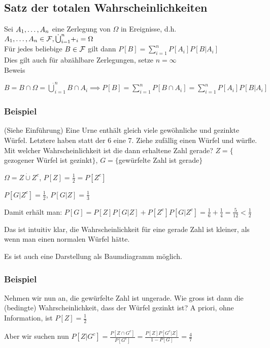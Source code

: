 \subsection{Satz der totalen Wahrscheinlichkeiten}
Sei $A_1, \mathellipsis, A_n$ eine Zerlegung von $\Omega$ in Ereignisse, d.h. $A_1, \mathellipsis, A_n \in \mathcal{F}, \dot\bigcup_{i=1}^n+_i = \Omega$\\
Für jedes beliebige $B \in \mathcal{F}$ gilt dann $P[B] = \sum^n_{i=1}P[A_i]P[B|A_i]$\\
Dies gilt auch für abzählbare Zerlegungen, setze $n = \infty$\\
Beweis
\enumstart
	\item $B = B \cap \Omega = \dot\bigcup_{i=1}^nB\cap A_i \implies P[B] = \sum_{i=1}^nP[B \cap A_i] = \sum_{i=1}^nP[A_i]P[B | A_i]$
\enumend

\subsubsection{Beispiel}
\enumstart
	\item (Siehe Einführung) Eine Urne enthält gleich viele gewöhnliche und gezinkte Würfel. Letztere haben statt der 6 eine 7. Ziehe zufällig einen Würfel und würfle. Mit welcher Wahrscheinlichkeit ist die dann erhaltene Zahl gerade? $Z=\{$gezogener Würfel ist gezinkt$\}$, $G=\{$gewürfelte Zahl ist gerade$\}$
	\item $\Omega = Z \dot\cup Z^c$, $P[Z] = \frac{1}{2} = P[Z^c]$
	\item $P[G | Z^c] = \frac{1}{2}$, $P[G | Z] = \frac{1}{3}$
	\item Damit erhält man: $P[G] = P[Z]P[G | Z] + P[Z^c]P[G | Z^c] = \frac{1}{6} + \frac{1}{4} = \frac{5}{12} < \frac{1}{2}$
	\item Das ist intuitiv klar, die Wahrscheinlichkeit für eine gerade Zahl ist kleiner, als wenn man einen normalen Würfel hätte.
	\item Es ist auch eine Darstellung als Baumdiagramm möglich.
\enumend

\subsubsection{Beispiel}
\enumstart
	\item  Nehmen wir nun an, die gewürfelte Zahl ist ungerade. Wie gross ist dann die (bedingte) Wahrscheinlichkeit, dass der Würfel gezinkt ist? A priori, ohne Information, ist $P[Z] = \frac{1}{2}$
	\item Aber wir suchen nun $P[Z | G^c] = \frac{P[Z \cap G^c]}{P[G^c]} = \frac{P[Z]P[G^c | Z]}{1 - P[G]} = \frac{4}{7}$
\enumend

